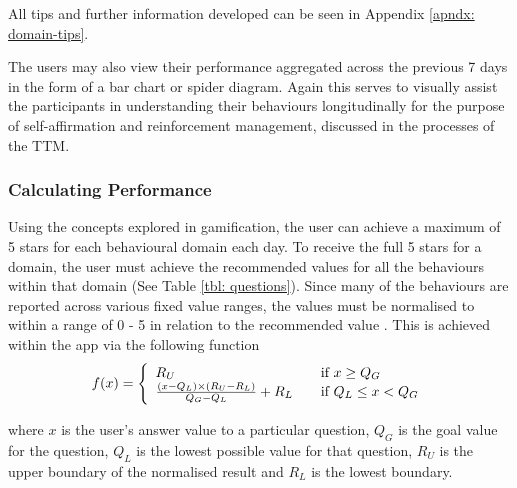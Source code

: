 All tips and further information developed can be seen in Appendix \ref{apndx: domain-tips}.

The users may also view their performance aggregated across the previous 7 days in the form of a bar chart or spider diagram. Again this serves to visually assist the participants in understanding their behaviours longitudinally for the purpose of self-affirmation and reinforcement management, discussed in the processes of the TTM.

\subsubsection{Calculating Performance} \label{subsubsection-calculating-performance}
Using the concepts explored in gamification, the user can achieve a maximum of 5 stars for each behavioural domain each day. To receive the full 5 stars for a domain, the user must achieve the recommended values for all the behaviours within that domain (See Table \ref{tbl: questions}). Since many of the behaviours are reported across various fixed value ranges, the values must be normalised to within a range of 0 - 5 in relation to the recommended value \cite{Hartin2014-IWAAL}. This is achieved within the app via the following function
\begin{equation}
f(x) = \left\{
         \begin{array}{l l}

         R_{U} & \quad
           \text{if }{x \geq Q_{G} }\\

           \frac{
           \left(x-Q_{L}\right)\times\left(R_{U}-R_{L}\right)}
           {Q_{G}-Q_{L}}
           + R_{L} & \quad
           \text{if }{Q_{L} \leq x < Q_{G}}\\

          \end{array}
          \right.
          \label{eq: calc-performance-stars}
\end{equation}

where $x$ is the user’s answer value to a particular question, $Q_{G}$ is the goal value for the question, $Q_{L}$ is the lowest possible value for that question, $R_{U}$ is the upper boundary of the normalised result and $R_{L}$ is the lowest boundary.

